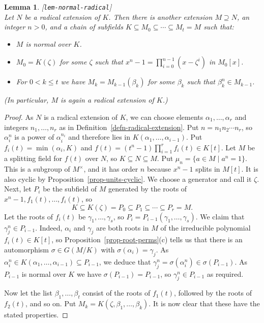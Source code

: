 \documentclass{amsart}
\newcommand{\lbl}[1]{\label{#1}\textup{[\texttt{#1}]}\ \\}
\newcommand{\lbl}{\label}
\newcommand{\al}        {\alpha}
\newcommand{\bt}        {\beta}
\newcommand{\gm}        {\gamma}
\newcommand{\zt}        {\zeta}
\newcommand{\sg}        {\sigma}
\newcommand{\st}        {\;|\;}
\newcommand{\tm}        {\times}
\newcommand{\sse}       {\subseteq}
\renewcommand{\:}{\colon}
\newtheorem{lemma}[theorem]{Lemma}
\theoremstyle{definition}
\begin{document}
\begin{lemma}\lbl{lem-normal-radical}
 Let $N$ be a radical extension of $K$.  Then there is another
 extension $M\supseteq N$, an integer $n>0$, and a chain of
 subfields $K\sse M_0\sse \dotsb \sse M_t=M$ such that:
 \begin{itemize}
  \item[(a)] $M$ is normal over $K$.
  \item[(b)] $M_0=K(\zt)$ for some $\zt$ such that
   $x^n-1=\prod_{i=0}^{n-1}(x-\zt^i)$ in $M_0[x]$.
  \item[(c)] For $0<k\leq t$ we have $M_k=M_{k-1}(\bt_k)$ for some 
   $\bt_k$ such that $\bt_k^n\in M_{k-1}$.
 \end{itemize}
 (In particular, $M$ is again a radical extension of $K$.)
\end{lemma}
\begin{proof}
 As $N$ is a radical extension of $K$, we can choose elements
 $\al_1,\dotsc,\al_r$ and integers $n_1,\dotsc,n_r$ as in
 Definition~\ref{defn-radical-extension}.  Put $n=n_1n_2\dotsb n_r$,
 so $\al_i^n$ is a power of $\al_i^{n_i}$ and therefore lies in
 $K(\al_1,\dotsc,\al_{i-1})$.  Put $f_i(t)=\min(\al_i,K)$ and
 $f(t)=(t^n-1)\prod_{i=1}^rf_i(t)\in K[t]$.  Let $M$ be a splitting
 field for $f(t)$ over $N$, so $K\sse N\sse M$.  Put
 $\mu_n=\{a\in M\st a^n=1\}$.  This is a subgroup of $M^\tm$, and it
 has order $n$ because $x^n-1$ splits in $M[t]$.  It is also cyclic by
 Proposition~\ref{prop-units-cyclic}.  We choose a generator and call
 it $\zt$.  Next, let $P_i$ be the
 subfield of $M$ generated by the roots of
 $x^n-1,f_1(t),\dotsc,f_i(t)$, so 
 \[ K \sse K(\zt) = P_0\sse P_1\sse \dotsb\sse P_r=M. \]
 Let the roots of $f_i(t)$ be $\gm_1,\dotsc,\gm_s$, so
 $P_i=P_{i-1}(\gm_1,\dotsc,\gm_s)$.  We claim that $\gm_j^n\in
 P_{i-1}$.  Indeed, $\al_i$ and $\gm_j$ are both roots in $M$ of the
 irreducible polynomial $f_i(t)\in K[t]$, so
 Proposition~\ref{prop-root-perms}(c) tells us that there is an
 automorphism $\sg\in G(M/K)$ with $\sg(\al_i)=\gm_j$.  As
 $\al_i^n\in K(\al_1,\dotsc,\al_{i-1})\sse P_{i-1}$, we deduce that
 $\gm_j^n=\sg(\al_i^n)\in\sg(P_{i-1})$.  As $P_{i-1}$ is normal over
 $K$ we have $\sg(P_{i-1})=P_{i-1}$, so $\gm_j^n\in P_{i-1}$ as
 required.  

 Now let the list $\bt_1,\dotsc,\bt_t$ consist of the roots of
 $f_1(t)$, followed by the roots of $f_2(t)$, and so on.  Put
 $M_k=K(\zt,\bt_1,\dotsc,\bt_k)$.  It is now clear that these have the
 stated properties.
\end{proof}
\end{document}
